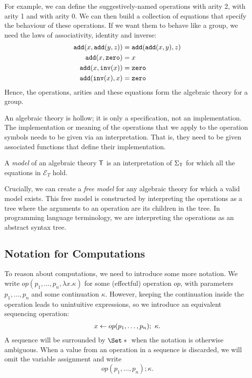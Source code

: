 For example, we can define the suggestively-named operations  with arity 2,  with arity 1 and  with arity 0. We can then build a collection of equations that specify the behaviour of these operations. If we want them to behave like a group, we need the laws of associativity, identity and inverse:
\begin{align*}
    \mathtt{add}(x, \mathtt{add}(y, z)) &= \mathtt{add}(\mathtt{add}(x, y), z) \\
    \mathtt{add}(x, \mathtt{zero}) &= x \\
    \mathtt{add}(x, \mathtt{inv}(x)) &= \mathtt{zero} \\
    \mathtt{add}(\mathtt{inv}(x), x) &= \mathtt{zero}
\end{align*}
Hence, the operations, arities and these equations form the algebraic theory for a group.

An algebraic theory is hollow; it is only a specification, not an implementation. The implementation or meaning of the operations that we apply to the operation symbols needs to be given via an interpretation. That is, they need to be given associated functions that define their implementation.

\begin{definition}[Model]
    A \emph{model} of an algebraic theory $\mathsf{T}$ is an interpretation of $\Sigma_\mathsf{T}$ for which all the equations in $\mathcal{E}_T$ hold.
\end{definition}

Crucially, we can create a \emph{free model} for any algebraic theory for which a valid model exists. This free model is constructed by interpreting the operations as a tree where the arguments to an operation are its children in the tree. In programming language terminology, we are interpreting the operations as an abstract syntax tree.

\subsection{Notation for Computations}

To reason about computations, we need to introduce some more notation. We write $op(p_1, \dots, p_n, \lambda x. \kappa)$ for some (effectful) operation $op$, with parameters $p_1,\dots,p_n$ and some continuation $\kappa$. However, keeping the continuation inside the operation leads to unintuitive expressions, so we introduce an equivalent sequencing operation:
\begin{align*}
    x \gets op(p_1,\dots,p_n);\  \kappa.
\end{align*}
A sequence will be surrounded by $\S{}$ when the notation is otherwise ambiguous. When a value from an operation in a sequence is discarded, we will omit the variable assignment and write 
\[ op(p_1,\dots,p_n); \kappa. \]

